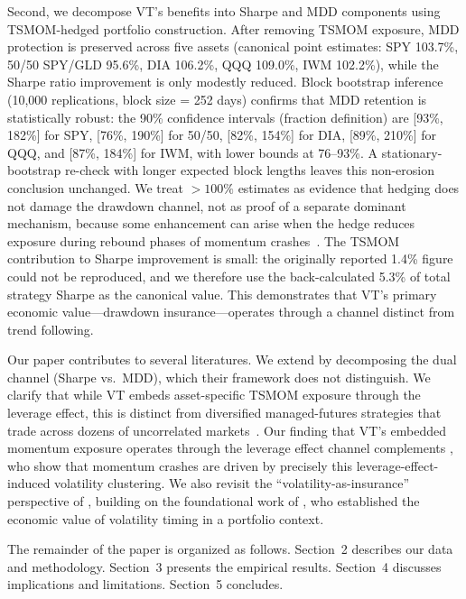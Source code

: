 Second, we decompose VT's benefits into Sharpe and MDD components using TSMOM-hedged portfolio construction. After removing TSMOM exposure, MDD protection is preserved across five assets (canonical point estimates: SPY 103.7\%, 50/50 SPY/GLD 95.6\%, DIA 106.2\%, QQQ 109.0\%, IWM 102.2\%), while the Sharpe ratio improvement is only modestly reduced. Block bootstrap inference (10,000 replications, block size = 252 days) confirms that MDD retention is statistically robust: the 90\% confidence intervals (fraction definition) are [93\%, 182\%] for SPY, [76\%, 190\%] for 50/50, [82\%, 154\%] for DIA, [89\%, 210\%] for QQQ, and [87\%, 184\%] for IWM, with lower bounds at 76--93\%. A stationary-bootstrap re-check with longer expected block lengths leaves this non-erosion conclusion unchanged. We treat $>100\%$ estimates as evidence that hedging does not damage the drawdown channel, not as proof of a separate dominant mechanism, because some enhancement can arise when the hedge reduces exposure during rebound phases of momentum crashes~\citep{daniel2016}. The TSMOM contribution to Sharpe improvement is small: the originally reported 1.4\% figure could not be reproduced, and we therefore use the back-calculated 5.3\% of total strategy Sharpe as the canonical value. This demonstrates that VT's primary economic value---drawdown insurance---operates through a channel distinct from trend following.


Our paper contributes to several literatures. We extend \citet{hood2025} by decomposing the dual channel (Sharpe vs.\ MDD), which their framework does not distinguish. We clarify that while VT embeds asset-specific TSMOM exposure through the leverage effect, this is distinct from diversified managed-futures strategies that trade across dozens of uncorrelated markets~\citep{moskowitz2012, baltas2013}. Our finding that VT's embedded momentum exposure operates through the leverage effect channel complements \citet{daniel2016}, who show that momentum crashes are driven by precisely this leverage-effect-induced volatility clustering. We also revisit the ``volatility-as-insurance'' perspective of \citet{lai2026a}, building on the foundational work of \citet{fleming2001}, who established the economic value of volatility timing in a portfolio context.

The remainder of the paper is organized as follows. Section~2 describes our data and methodology. Section~3 presents the empirical results. Section~4 discusses implications and limitations. Section~5 concludes.


